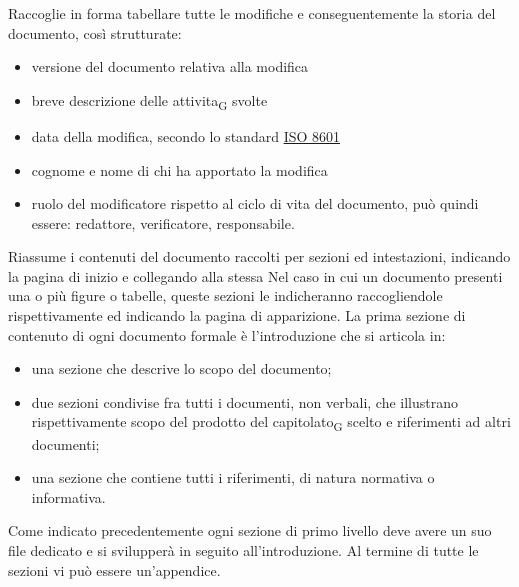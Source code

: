     Raccoglie in forma tabellare tutte le modifiche e conseguentemente la storia del documento, così strutturate:
    \begin{itemize}
        \item versione del documento relativa alla modifica
        \item breve descrizione delle attivita\textsubscript{G} svolte
        \item data della modifica, secondo lo standard \href{https://www.iso.org/iso-8601-date-and-time-format.html}{ISO 8601}
        \item cognome e nome di chi ha apportato la modifica
        \item ruolo del modificatore rispetto al ciclo di vita del documento, può quindi essere: redattore, verificatore, responsabile.
    \end{itemize}
    Riassume i contenuti del documento raccolti per sezioni ed intestazioni, indicando la pagina di inizio e collegando alla stessa
    Nel caso in cui un documento presenti una o più figure o tabelle, queste sezioni le indicheranno raccogliendole rispettivamente ed indicando la pagina di apparizione.
    La prima sezione di contenuto di ogni documento formale è l'introduzione che si articola in:
    \begin{itemize}
        \item una sezione che descrive lo scopo del documento;
        \item due sezioni condivise fra tutti i documenti, non verbali, che illustrano rispettivamente scopo del prodotto del capitolato\textsubscript{G} scelto e riferimenti ad altri documenti;
        \item una sezione che contiene tutti i riferimenti, di natura normativa o informativa.
    \end{itemize}
    Come indicato precedentemente ogni sezione di primo livello deve avere un suo file dedicato e si svilupperà in seguito all'introduzione. Al termine di tutte le sezioni vi può essere un'appendice.

